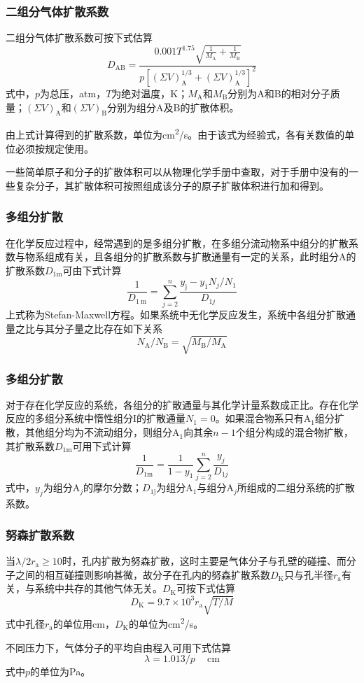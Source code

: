 \documentclass[dvipsnames, svgnames, x11names]{beamer}
\begin{document}
\begin{frame}
    \frametitle{二组分气体扩散系数}

    
二组分气体扩散系数可按下式估算
\[
    D_{\mathrm{AB}}=\frac{0.001 T^{1.75} \sqrt{\frac{1}{M_{\mathrm{A}}}+\frac{1}{M_{\mathrm{B}}}}}{p\left[(\Sigma V)_{\mathrm{A}}^{1 / 3}+(\Sigma V)_{\mathrm{A}}^{1 / 3}\right]^{2}}
\]
式中，$p$为总压，atm，$T$为绝对温度，K；$M_\mathrm{A}$和$M_\mathrm{B}$分别为A和B的相对分子质量；$(\Sigma V)_{\mathrm{A}}$和$(\Sigma V)_{\mathrm{B}}$分别为组分A及B的扩散体积。

由上式计算得到的扩散系数，单位为\si{cm^2/s}。由于该式为经验式，各有关数值的单位必须按规定使用。

一些简单原子和分子的扩散体积可以从物理化学手册中查取，对于手册中没有的一些复杂分子，其扩散体积可按照组成该分子的原子扩散体积进行加和得到。

\end{frame}


\begin{frame}
    \frametitle{多组分扩散}

    在化学反应过程中，经常遇到的是多组分扩散，在多组分流动物系中组分的扩散系数与物系组成有关，且各组分的扩散系数与扩散通量有一定的关系，此时组分A的扩散系数$D_\mathrm{1m}$可由下式计算
    \[
        \frac{1}{D_{1\mathrm{~m}}}=\sum_{j=2}^{n} \frac{y_{\mathrm{j}}-y_{1} N_{j} / N_{1}}{D_{1 j}} 
    \]
    上式称为Stefan-Maxwell方程。如果系统中无化学反应发生，系统中各组分扩散通量之比与其分子量之比存在如下关系
    \[
        N_{\mathrm{A}} / N_{\mathrm{B}}=\sqrt{M_{\mathrm{B}} / M_{\mathrm{A}}} 
    \]

\end{frame}


\begin{frame}
    \frametitle{多组分扩散}

    对于存在化学反应的系统，各组分的扩散通量与其化学计量系数成正比。存在化学反应的多组分系统中惰性组分I的扩散通量$N_1 = 0$。如果混合物系只有A$_1$组分扩散，其他组分均为不流动组分，则组分A$_1$向其余$n-1$个组分构成的混合物扩散，其扩散系数$D_\mathrm{1m}$可用下式计算
    \[
        \frac{1}{D_{1\mathrm{m}}}=\frac{1}{1-y_{1}} \sum_{j=2}^{n} \frac{y_{j}}{D_{1 j}}
    \]
    式中，$y_{j}$为组分A$_j$的摩尔分数；$D_\mathrm{1j}$为组分A$_1$与组分A$_j$所组成的二组分系统的扩散系数。

\end{frame}


\begin{frame}
    \frametitle{努森扩散系数}

    当$\lambda /2r_\mathrm{a} \geqslant 10$时，孔内扩散为努森扩散，这时主要是气体分子与孔壁的碰撞、而分子之间的相互碰撞则影响甚微，故分子在孔内的努森扩散系数$D_\mathrm{K}$只与孔半径$r_\mathrm{a}$有关，与系统中共存的其他气体无关。$D_\mathrm{K}$可按下式估算
    \[
        D_{\mathrm{K}}=9.7 \times 10^{3} r_{\mathrm{a}} \sqrt{T / M} 
    \]
    式中孔径$r_\mathrm{a}$的单位用cm，$D_\mathrm{K}$的单位为\si{cm^2/s}。
    
    不同压力下，气体分子的平均自由程入可用下式估算
    \[
        \lambda=1.013 / p \quad \mathrm{~cm}
    \]
    式中$p$的单位为Pa。

\end{frame}
\end{document}
